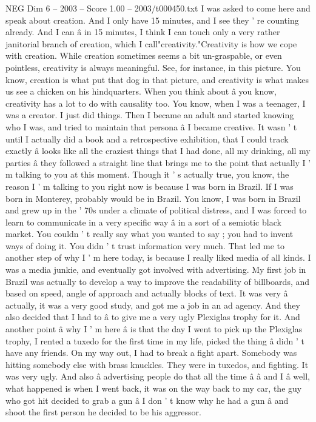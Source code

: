 \begin{textsample}{NEG Dim 6 – 2003 – Score 1.00 – 2003/t000450.txt}  \label{ex:f6_neg_058}
I was asked to come here and speak about creation.
And I only have 15 minutes, and I see they ' re counting already.
And I can â in 15 minutes, I think I can touch only a very rather janitorial branch of creation, which I call"creativity."Creativity is how we cope with creation.
While creation sometimes seems a bit un-graspable, or even pointless, creativity is always meaningful.
See, for instance, in this picture.
You know, creation is what put that dog in that picture, and creativity is what makes us see a chicken on his hindquarters.
When you think about â you know, creativity has a lot to do with causality too.
You know, when I was a teenager, I was a creator.
I just did things.
Then I became an adult and started knowing who I was, and tried to maintain that persona â I became creative.
It wasn ' t until I actually did a book and a retrospective exhibition, that I could track exactly â looks like all the craziest things that I had done, all my drinking, all my parties â they followed a straight line that brings me to the point that actually I ' m talking to you at this moment.
Though it ' s actually true, you know, the reason I ' m talking to you right now is because I was born in Brazil.
If I was born in Monterey, probably would be in Brazil.
You know, I was born in Brazil and grew up in the ' 70s under a climate of political distress, and I was forced to learn to communicate in a very specific way â in a sort of a semiotic black market.
You couldn ' t really say what you wanted to say ; you had to invent ways of doing it.
You didn ' t trust information very much.
That led me to another step of why I ' m here today, is because I really liked media of all kinds.
I was a media junkie, and eventually got involved with advertising.
My first job in Brazil was actually to develop a way to improve the readability of billboards, and based on speed, angle of approach and actually blocks of text.
It was very â actually, it was a very good study, and got me a job in an ad agency.
And they also decided that I had to â to give me a very ugly Plexiglas trophy for it.
And another point â why I ' m here â is that the day I went to pick up the Plexiglas trophy, I rented a tuxedo for the first time in my life, picked the thing â didn ' t have any friends.
On my way out, I had to break a fight apart.
Somebody was hitting somebody else with brass knuckles.
They were in tuxedos, and fighting.
It was very ugly.
And also â advertising people do that all the time â â and I â well, what happened is when I went back, it was on the way back to my car, the guy who got hit decided to grab a gun â I don ' t know why he had a gun â and shoot the first person he decided to be his aggressor.

\end{textsample}
